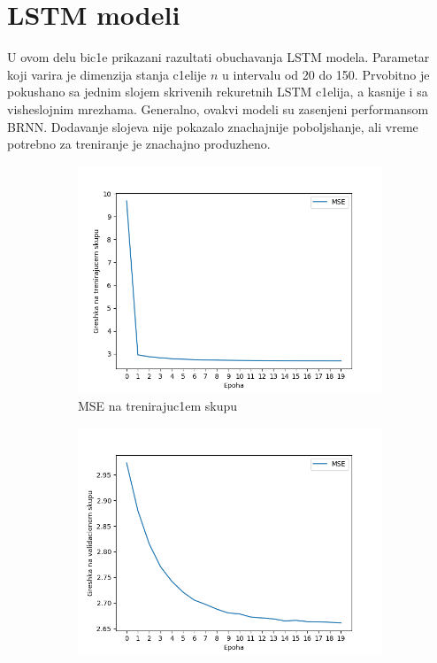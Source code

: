 \documentclass[a4paper, openany, oneside, 11pt]{book}
\begin{document}
\section[$LSTM$ modeli]{$\mathbf{LSTM}$ modeli}
U ovom delu bic1e prikazani razultati obuchavanja \acrshort{LSTM} modela. Parametar koji varira je dimenzija stanja c1elije $n$ u intervalu od 20 do 150. Prvobitno je pokushano sa jednim slojem skrivenih rekuretnih \acrshort{LSTM} c1elija, a kasnije i sa vi\-sheslojnim mrezhama. Generalno, ovakvi modeli su zasenjeni performansom \acrshort{BRNN}. Dodavanje slojeva nije pokazalo znachajnije poboljshanje, ali vreme potrebno za treniranje je znachajno produzheno.
\newpage
\begin{figure}[!h]
        \centering
        \begin{subfigure}{0.475\textwidth}
            \centering
            \includegraphics[scale=0.45]{res/SingleLayerLSTM_30units_train.png}
            \caption{\acrshort{MSE} na trenirajuc1em skupu}
            \label{fig:4_1a}
            \vspace{0pt}
        \end{subfigure}%
        \begin{subfigure}{0.475\textwidth}
            \centering
            \includegraphics[scale=0.45]{res/SingleLayerLSTM_30units_validation.png}

\end{subfigure}
\end{figure}
\end{document}
